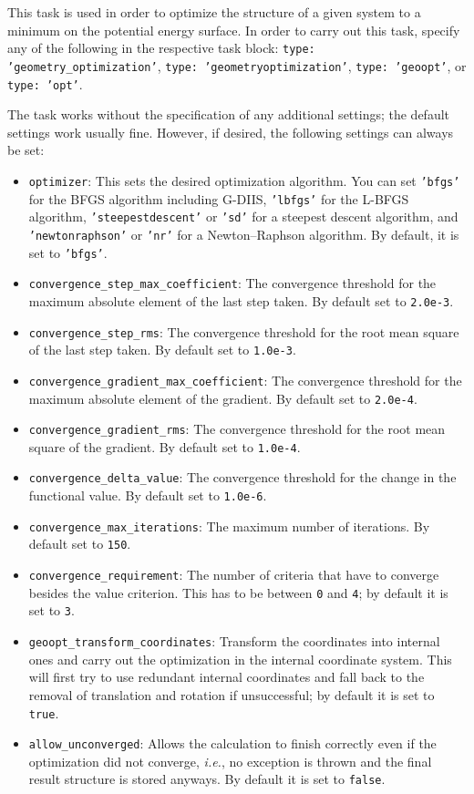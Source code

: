 \documentclass[]{tufte-book}
\begin{document}
This task is used in order to optimize the structure of a given system to a minimum on the potential energy surface. In 
order to carry out this task, specify any of the following in the respective task block: \texttt{type: 'geometry\_optimization'}, 
\texttt{type: 'geometryoptimization'}, \texttt{type: 'geoopt'}, or \texttt{type: 'opt'}.

The task works without the specification of any additional settings; the default settings work usually fine. However,
if desired, the following settings can always be set:
\begin{itemize}
\item \texttt{optimizer}: This sets the desired optimization algorithm. You can set \texttt{'bfgs'} for the BFGS algorithm including
G-DIIS, \texttt{'lbfgs'} for the L-BFGS algorithm,
\texttt{'steepestdescent'} or \texttt{'sd'} for a steepest descent algorithm, and \texttt{'newtonraphson'} or \texttt{'nr'} for
a Newton--Raphson algorithm. By default, it is set to \texttt{'bfgs'}.
\item \texttt{convergence\_step\_max\_coefficient}: The convergence threshold for the maximum absolute element of the last step taken.
By default set to \texttt{2.0e-3}.
\item \texttt{convergence\_step\_rms}: The convergence threshold for the root mean square of the last step taken. By default set to 
\texttt{1.0e-3}.
\item \texttt{convergence\_gradient\_max\_coefficient}: The convergence threshold for the maximum absolute element of the gradient. 
By default set to \texttt{2.0e-4}.
\item \texttt{convergence\_gradient\_rms}: The convergence threshold for the root mean square of the gradient. By default set to 
\texttt{1.0e-4}.
\item \texttt{convergence\_delta\_value}: The convergence threshold for the change in the functional value. By default set to
\texttt{1.0e-6}.
\item \texttt{convergence\_max\_iterations}: The maximum number of iterations. By default set to \texttt{150}.
\item \texttt{convergence\_requirement}: The number of criteria that have to converge besides the value criterion. This 
has to be between \texttt{0} and \texttt{4}; by default it is set to \texttt{3}.
\item \texttt{geoopt\_transform\_coordinates}: Transform the coordinates into internal ones and carry out the optimization
in the internal coordinate system. This will first try to use redundant internal coordinates\cite{libirc} and fall back to the removal
of translation and rotation if unsuccessful; by default it is set to \texttt{true}.
\item \texttt{allow\_unconverged}: Allows the calculation to finish correctly even if the optimization did not 
converge, \textit{i.e.}, no exception is thrown and the final result structure is stored anyways. By default it is set to \texttt{false}.
\end{itemize}
\end{document}
